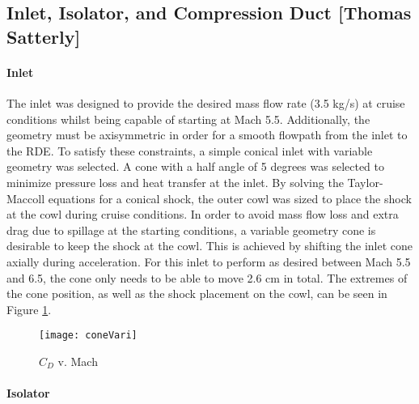 \subsection{Inlet, Isolator, and Compression Duct [Thomas Satterly]}
\paragraph{Inlet}

The inlet was designed to provide the desired mass flow rate (3.5 kg/s) at cruise conditions whilst being capable of starting at Mach 5.5. Additionally, the geometry must be axisymmetric in order for a smooth flowpath from the inlet to the RDE. To satisfy these constraints, a simple conical inlet with variable geometry was selected. 
A cone with a half angle of 5 degrees was selected to minimize pressure loss and heat transfer at the inlet. By solving the Taylor-Maccoll equations for a conical shock, the outer cowl was sized to place the shock at the cowl during cruise conditions. In order to avoid mass flow loss and extra drag due to spillage at the starting conditions, a variable geometry cone is desirable to keep the shock at the cowl. This is achieved by shifting the inlet cone axially during acceleration. For this inlet to perform as desired between Mach 5.5 and 6.5, the cone only needs to be able to move 2.6 cm in total. The extremes of the cone position, as well as the shock placement on the cowl, can be seen in Figure \ref{fig:coneVari}.

\begin{figure}[H]
\begin{center}
\texttt{[image: coneVari]}
\caption{$C_D$ v. Mach}
\label{fig:coneVari}
\end{center}
\end{figure}

\paragraph{Isolator}

